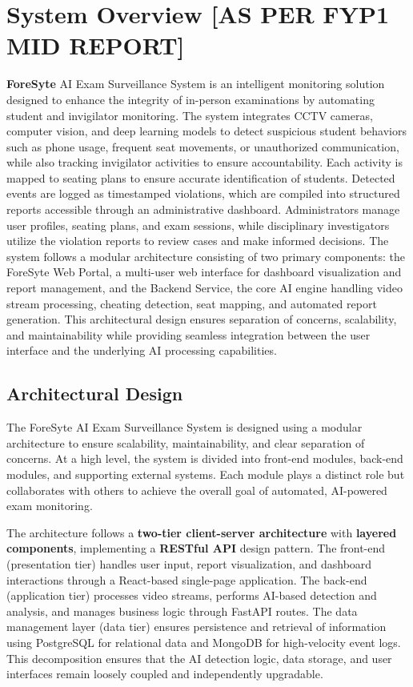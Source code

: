 \chapter{System Overview [AS PER FYP1 MID REPORT]}

\textbf{ForeSyte} AI Exam Surveillance System is an intelligent monitoring solution designed to enhance the integrity of in-person examinations by automating student and invigilator monitoring. The system integrates CCTV cameras, computer vision, and deep learning models to detect suspicious student behaviors such as phone usage, frequent seat movements, or unauthorized communication, while also tracking invigilator activities to ensure accountability. Each activity is mapped to seating plans to ensure accurate identification of students. Detected events are logged as timestamped violations, which are compiled into structured reports accessible through an administrative dashboard. Administrators manage user profiles, seating plans, and exam sessions, while disciplinary investigators utilize the violation reports to review cases and make informed decisions. The system follows a modular architecture consisting of two primary components: the ForeSyte Web Portal, a multi-user web interface for dashboard visualization and report management, and the Backend Service, the core AI engine handling video stream processing, cheating detection, seat mapping, and automated report generation. This architectural design ensures separation of concerns, scalability, and maintainability while providing seamless integration between the user interface and the underlying AI processing capabilities.

\section{Architectural Design}

The ForeSyte AI Exam Surveillance System is designed using a modular architecture to ensure scalability, maintainability, and clear separation of concerns. At a high level, the system is divided into front-end modules, back-end modules, and supporting external systems. Each module plays a distinct role but collaborates with others to achieve the overall goal of automated, AI-powered exam monitoring.

The architecture follows a \textbf{two-tier client-server architecture} with \textbf{layered components}, implementing a \textbf{RESTful API} design pattern. The front-end (presentation tier) handles user input, report visualization, and dashboard interactions through a React-based single-page application. The back-end (application tier) processes video streams, performs AI-based detection and analysis, and manages business logic through FastAPI routes. The data management layer (data tier) ensures persistence and retrieval of information using PostgreSQL for relational data and MongoDB for high-velocity event logs. This decomposition ensures that the AI detection logic, data storage, and user interfaces remain loosely coupled and independently upgradable.

